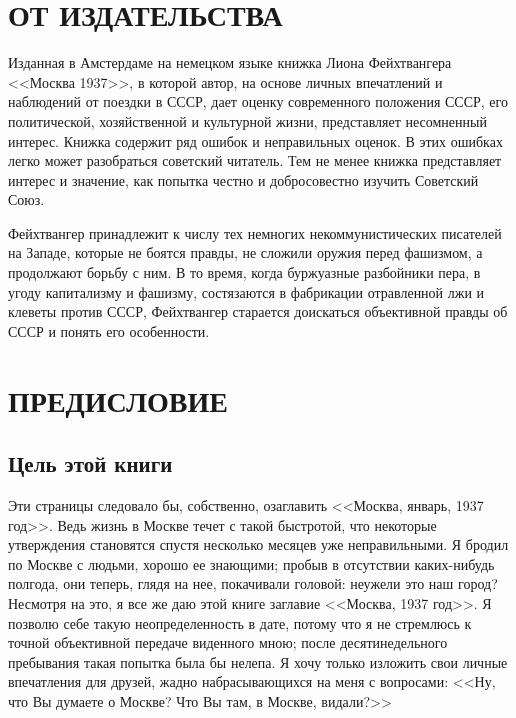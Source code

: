 \documentclass[12pt, a4paper, openany]{book}
\begin{document}
\newpage
\tableofcontents

\thispagestyle{empty} %

\newpage

\setcounter{secnumdepth}{0} 


\section[От издательства]{ОТ ИЗДАТЕЛЬСТВА}


Изданная в Амстердаме на немецком языке книжка Лиона Фейхтвангера <<Москва 1937>>, в которой автор, на основе личных впечатлений и наблюдений от поездки в СССР, дает оценку современного положения СССР, его политической, хозяйственной и культурной жизни, представляет несомненный интерес. Книжка содержит ряд ошибок и неправильных оценок. В этих ошибках легко может разобраться советский читатель. Тем не менее книжка представляет интерес и значение, как попытка честно и добросовестно изучить Советский Союз.

Фейхтвангер принадлежит к числу тех немногих некоммунистических писателей на Западе, которые не боятся правды, не сложили оружия перед фашизмом, а продолжают борьбу с ним. В то время, когда буржуазные разбойники пера, в угоду капитализму и фашизму, состязаются в фабрикации отравленной лжи и клеветы против СССР, Фейхтвангер старается доискаться объективной правды об СССР и понять его особенности.

\newpage

\section[Предисловие]{ПРЕДИСЛОВИЕ}

\subsection*{Цель этой книги}

Эти страницы следовало бы, собственно, озаглавить <<Москва, январь, 1937 год>>. Ведь жизнь в Москве течет с такой быстротой, что некоторые утверждения становятся спустя несколько месяцев уже неправильными. Я бродил по Москве с людьми, хорошо ее знающими; пробыв в отсутствии каких-нибудь полгода, они теперь, глядя на нее, покачивали головой: неужели это наш город? Несмотря на это, я все же даю этой книге заглавие <<Москва, 1937 год>>. Я позволю себе такую неопределенность в дате, потому что я не стремлюсь к точной объективной передаче виденного мною; после десятинедельного пребывания такая попытка была бы нелепа. Я хочу только изложить свои личные впечатления для друзей, жадно набрасывающихся на меня с вопросами: <<Ну, что Вы думаете о Москве? Что Вы там, в Москве, видали?>>
\end{document}
